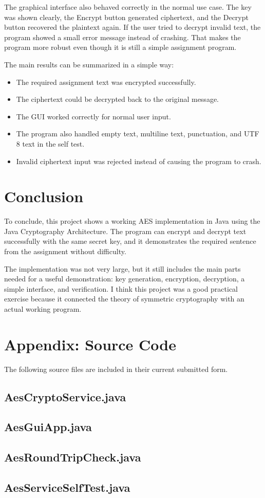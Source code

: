 \documentclass[12pt,a4paper]{article}
\begin{document}
The graphical interface also behaved correctly in the normal use case. The key was shown clearly, the Encrypt button generated ciphertext, and the Decrypt button recovered the plaintext again. If the user tried to decrypt invalid text, the program showed a small error message instead of crashing. That makes the program more robust even though it is still a simple assignment program.

The main results can be summarized in a simple way:

\begin{itemize}[leftmargin=1.6em]
    \item The required assignment text was encrypted successfully.
    \item The ciphertext could be decrypted back to the original message.
    \item The GUI worked correctly for normal user input.
    \item The program also handled empty text, multiline text, punctuation, and UTF 8 text in the self test.
    \item Invalid ciphertext input was rejected instead of causing the program to crash.
\end{itemize}

\section{Conclusion}
To conclude, this project shows a working AES implementation in Java using the Java Cryptography Architecture. The program can encrypt and decrypt text successfully with the same secret key, and it demonstrates the required sentence from the assignment without difficulty.

The implementation was not very large, but it still includes the main parts needed for a useful demonstration: key generation, encryption, decryption, a simple interface, and verification. I think this project was a good practical exercise because it connected the theory of symmetric cryptography with an actual working program.

\section*{Appendix: Source Code}
The following source files are included in their current submitted form.

\begingroup
\singlespacing
\subsection*{AesCryptoService.java}


\subsection*{AesGuiApp.java}


\subsection*{AesRoundTripCheck.java}


\subsection*{AesServiceSelfTest.java}

\endgroup
\end{document}
